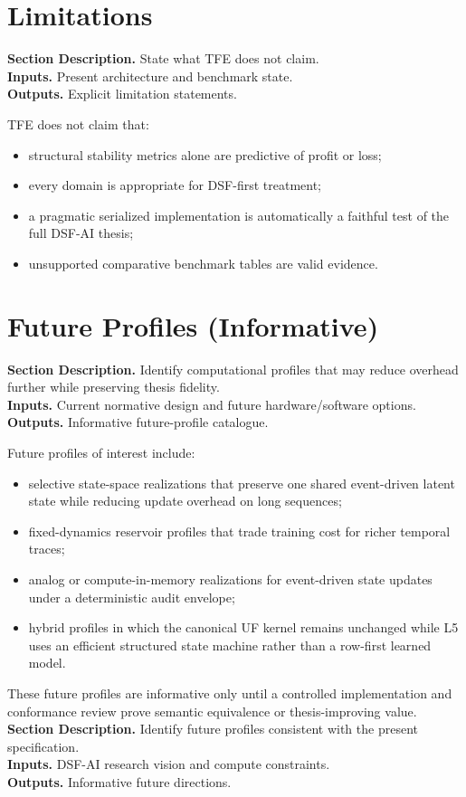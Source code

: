 \documentclass[11pt]{report}
\newcommand{\meta}[3]{\textbf{Section Description.} #1\\
\textbf{Inputs.} #2\\
\textbf{Outputs.} #3\par}
\begin{document}
\section{Limitations}
\meta{State what TFE does not claim.}{Present architecture and benchmark state.}{Explicit limitation statements.}

TFE does not claim that:
\begin{itemize}
    \item structural stability metrics alone are predictive of profit or loss;
    \item every domain is appropriate for DSF-first treatment;
    \item a pragmatic serialized implementation is automatically a faithful test of the full DSF-AI thesis;
    \item unsupported comparative benchmark tables are valid evidence.
\end{itemize}

\section{Future Profiles (Informative)}
\meta{Identify computational profiles that may reduce overhead further while preserving thesis fidelity.}{Current normative design and future hardware/software options.}{Informative future-profile catalogue.}

Future profiles of interest include:
\begin{itemize}
    \item selective state-space realizations that preserve one shared event-driven latent state while reducing update overhead on long sequences;
    \item fixed-dynamics reservoir profiles that trade training cost for richer temporal traces;
    \item analog or compute-in-memory realizations for event-driven state updates under a deterministic audit envelope;
    \item hybrid profiles in which the canonical UF kernel remains unchanged while L5 uses an efficient structured state machine rather than a row-first learned model.
\end{itemize}
These future profiles are informative only until a controlled implementation and conformance review prove semantic equivalence or thesis-improving value.
\meta{Identify future profiles consistent with the present specification.}{DSF-AI research vision and compute constraints.}{Informative future directions.}
\end{document}
